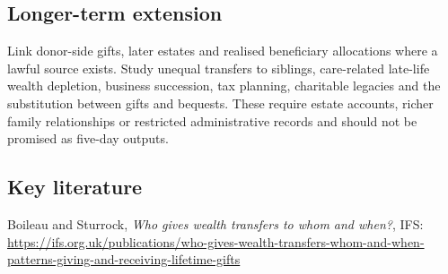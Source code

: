 \subsection{Longer-term extension}
Link donor-side gifts, later estates and realised beneficiary allocations where a lawful source exists. Study unequal transfers to siblings, care-related late-life wealth depletion, business succession, tax planning, charitable legacies and the substitution between gifts and bequests. These require estate accounts, richer family relationships or restricted administrative records and should not be promised as five-day outputs.

\subsection{Key literature}
Boileau and Sturrock, \emph{Who gives wealth transfers to whom and when?}, IFS:
\url{https://ifs.org.uk/publications/who-gives-wealth-transfers-whom-and-when-patterns-giving-and-receiving-lifetime-gifts}
